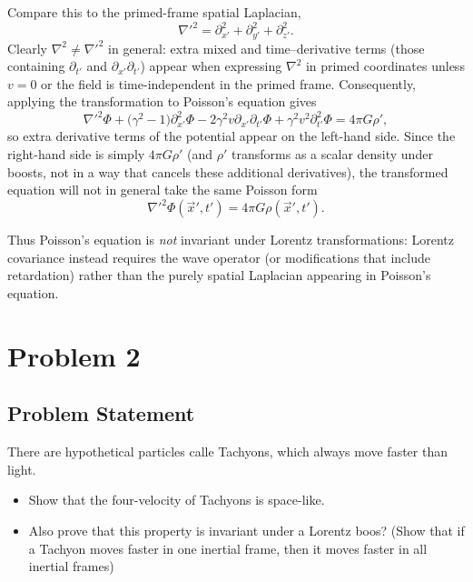 \documentclass[10pt,twocoloumn]{article}
\begin{document}
Compare this to the primed-frame spatial Laplacian,
\begin{equation}
\nabla'^2 = \partial_{x'}^2 + \partial_{y'}^2 + \partial_{z'}^2.
\end{equation}
Clearly $\nabla^2\neq\nabla'^2$ in general: extra mixed and time–derivative terms (those containing $\partial_{t'}$ and $\partial_{x'}\partial_{t'}$) appear when expressing $\nabla^2$ in primed coordinates unless $v=0$ or the field is time-independent in the primed frame. Consequently, applying the transformation to Poisson's equation gives
\begin{equation}
\nabla'^2\Phi + \big(\gamma^2-1\big)\partial_{x'}^2\Phi
-2\gamma^2 v\partial_{x'}\partial_{t'}\Phi + \gamma^2 v^2 \partial_{t'}^2\Phi
= 4\pi G\rho',
\end{equation}
so extra derivative terms of the potential appear on the left-hand side. Since the right-hand side is simply $4\pi G\rho'$ (and $\rho'$ transforms as a scalar density under boosts, not in a way that cancels these additional derivatives), the transformed equation will not in general take the same Poisson form
\begin{equation}
\nabla'^2\Phi(\vec x',t') = 4\pi G\rho(\vec x',t').
\end{equation}

Thus Poisson's equation is \emph{not} invariant under Lorentz transformations: Lorentz covariance instead requires the wave operator (or modifications that include retardation) rather than the purely spatial Laplacian appearing in Poisson's equation.

\section*{Problem 2}
\subsection*{Problem Statement}
There are hypothetical particles calle Tachyons, which always move faster than light.
\begin{itemize}
    \item Show that the four-velocity of Tachyons is space-like.
    \item Also prove that this property is invariant under a Lorentz boos? (Show that if a Tachyon moves faster in one inertial frame, then it moves faster in all inertial frames)
\end{itemize}
\end{document}
